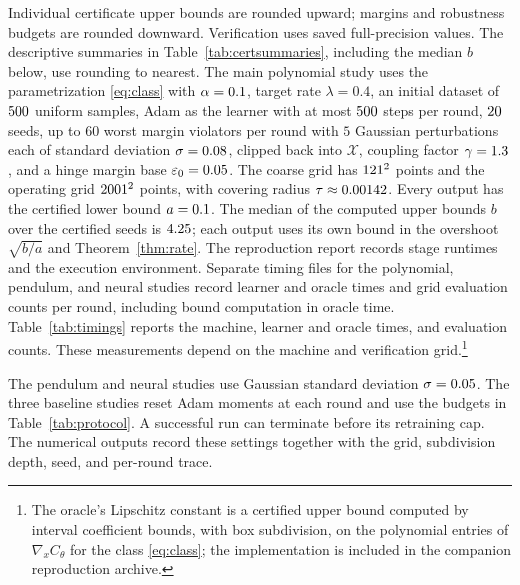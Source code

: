 \documentclass[12pt,onecolumn,journal]{IEEEtran}
\newcommand{\X}{\mathcal{X}}
\begin{document}
Individual certificate upper bounds are rounded upward; margins and robustness budgets are rounded downward. Verification uses saved full-precision values. The descriptive summaries in Table~\ref{tab:certsummaries}, including the median $b$ below, use rounding to nearest. The main polynomial study uses the parametrization \eqref{eq:class} with $\alpha = 0.1$, target rate $\lambda = 0.4$, an initial dataset of $500$ uniform samples, Adam as the learner with at most $500$ steps per round, $20$ seeds, up to $60$ worst margin violators per round with $5$ Gaussian perturbations each of standard deviation $\sigma=0.08$, clipped back into $\X$, coupling factor $\gamma = 1.3$, and a hinge margin base $\varepsilon_0 = 0.05$. The coarse grid has $121^2$ points and the operating grid $2001^2$ points, with covering radius $\tau \approx 0.00142$. Every output has the certified lower bound $a = 0.1$. The median of the computed upper bounds $b$ over the certified seeds is $4.25$; each output uses its own bound in the overshoot $\sqrt{b/a}$ and Theorem~\ref{thm:rate}. The reproduction report records stage runtimes and the execution environment. Separate timing files for the polynomial, pendulum, and neural studies record learner and oracle times and grid evaluation counts per round, including bound computation in oracle time. Table~\ref{tab:timings} reports the machine, learner and oracle times, and evaluation counts. These measurements depend on the machine and verification grid.\footnote{The oracle's Lipschitz constant is a certified upper bound computed by interval coefficient bounds, with box subdivision, on the polynomial entries of $\nabla_x C_\theta$ for the class \eqref{eq:class}; the implementation is included in the companion reproduction archive.}

The pendulum and neural studies use Gaussian standard deviation $\sigma=0.05$. The three baseline studies reset Adam moments at each round and use the budgets in Table~\ref{tab:protocol}. A successful run can terminate before its retraining cap. The numerical outputs record these settings together with the grid, subdivision depth, seed, and per-round trace.
\end{document}
